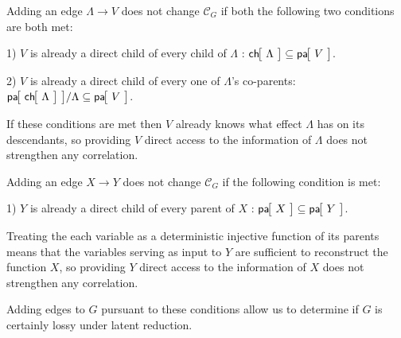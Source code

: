 Adding an edge $\Lambda \to V$ does not change $\mathcal{C}_{G}$ if both the following two conditions are both met: 

1) $V$ is already a direct child of every child of $\Lambda$ : $\NamedFunction{ch}{\!\Lambda\!} \subseteq \NamedFunction{pa}{\!V\!}$.

2) $V$ is already a direct child of every one of $\Lambda$'s co-parents: $\NamedFunction{pa}{\!\NamedFunction{ch}{\!\Lambda\!}\!}/\Lambda \subseteq \NamedFunction{pa}{\!V\!}$.

\noindent If these conditions are met then $V$ already knows what effect $\Lambda$ has on its descendants, so providing $V$ direct access to the information of  $\Lambda$ does not strengthen any correlation.

Adding an edge $X \to Y$ does not change $\mathcal{C}_{G}$ if the following condition is met: 

1) $Y$ is already a direct child of every parent of $X$ : $\NamedFunction{pa}{\!X\!} \subseteq \NamedFunction{pa}{\!Y\!}$.

\noindent Treating the each variable as a deterministic injective function of its parents means that the variables serving as input to $Y$ are sufficient to reconstruct the function $X$, so providing $Y$ direct access to the information of $X$ does not strengthen any correlation.

Adding edges to $G$ pursuant to these conditions allow us to determine if $G$ is certainly lossy under latent reduction.






